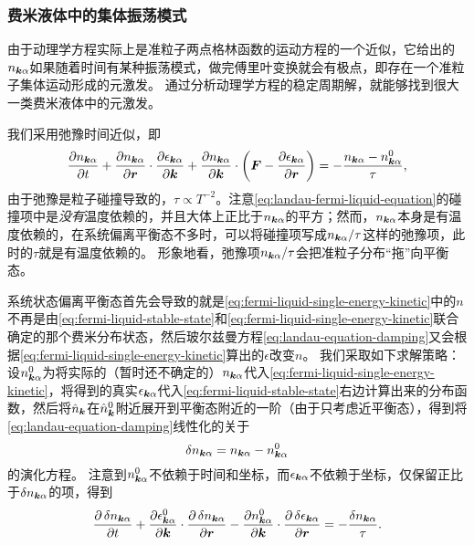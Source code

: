 \subsubsection{费米液体中的集体振荡模式}

由于动理学方程实际上是准粒子两点格林函数的运动方程的一个近似，它给出的$n_{\vb*{k} \alpha}$如果随着时间有某种振荡模式，做完傅里叶变换就会有极点，即存在一个准粒子集体运动形成的元激发。
通过分析动理学方程的稳定周期解，就能够找到很大一类费米液体中的元激发。

我们采用弛豫时间近似，即
\begin{equation}
    \pdv{n_{\vb*{k} \alpha}}{t} + \pdv{n_{\vb*{k} \alpha}}{\vb*{r}} \cdot \pdv{\epsilon_{\vb*{k} \alpha}}{\vb*{k}} + \pdv{n_{\vb*{k} \alpha}}{\vb*{k}} \cdot \left( \vb*{F} - \pdv{\epsilon_{\vb*{k} \alpha}}{\vb*{r}} \right) = - \frac{n_{\vb*{k} \alpha} - n_{\vb*{k} \alpha}^0}{\tau},
    \label{eq:landau-equation-damping}
\end{equation}
由于弛豫是粒子碰撞导致的，$\tau \propto T^{-2}$。注意\eqref{eq:landau-fermi-liquid-equation}的碰撞项中是\emph{没有}温度依赖的，并且大体上正比于$n_{\vb*{k} \alpha}$的平方；然而，$n_{\vb*{k} \alpha}$本身是有温度依赖的，在系统偏离平衡态不多时，可以将碰撞项写成$n_{\vb*{k} \alpha} / \tau$这样的弛豫项，此时的$\tau$就是有温度依赖的。
形象地看，弛豫项$n_{\vb*{k} \alpha} / \tau$会把准粒子分布“拖”向平衡态。

系统状态偏离平衡态首先会导致的就是\eqref{eq:fermi-liquid-single-energy-kinetic}中的$n$不再是由\eqref{eq:fermi-liquid-stable-state}和\eqref{eq:fermi-liquid-single-energy-kinetic}联合确定的那个费米分布状态，然后玻尔兹曼方程\eqref{eq:landau-equation-damping}又会根据\eqref{eq:fermi-liquid-single-energy-kinetic}算出的$\epsilon$改变$n$。
我们采取如下求解策略：设${n}^0_{\vb*{k} \alpha}$为将实际的（暂时还不确定的）${n}_{\vb*{k} \alpha}$代入\eqref{eq:fermi-liquid-single-energy-kinetic}，将得到的真实$\epsilon_{\vb*{k} \alpha}$代入\eqref{eq:fermi-liquid-stable-state}右边计算出来的分布函数，然后将$\hat{n}_{\vb*{k}}$在$\hat{n}^0_{\vb*{k}}$附近展开到平衡态附近的一阶（由于只考虑近平衡态），得到将\eqref{eq:landau-equation-damping}线性化的关于
\begin{equation}
    \var{n_{\vb*{k} \alpha}} = n_{\vb*{k} \alpha} - n_{\vb*{k} \alpha}^0
\end{equation}
的演化方程。
注意到$n_{\vb*{k} \alpha}^0$不依赖于时间和坐标，而$\epsilon_{\vb*{k} \alpha}$不依赖于坐标，仅保留正比于$\var{n}_{\vb*{k} \alpha}$的项，得到
\begin{equation}
    \pdv{\var{n}_{\vb*{k} \alpha}}{t} + \pdv{\epsilon^0_{\vb*{k} \alpha}}{\vb*{k}} \cdot \pdv{\var{n_{\vb*{k} \alpha}}}{\vb*{r}} - \pdv{n^0_{\vb*{k} \alpha}}{\vb*{k}} \cdot \pdv{\var{\epsilon_{\vb*{k} \alpha}}}{\vb*{r}} = - \frac{\var{n}_{\vb*{k} \alpha}}{\tau}.
    \label{eq:delta-from-stable-fermi-liquid}
\end{equation}

